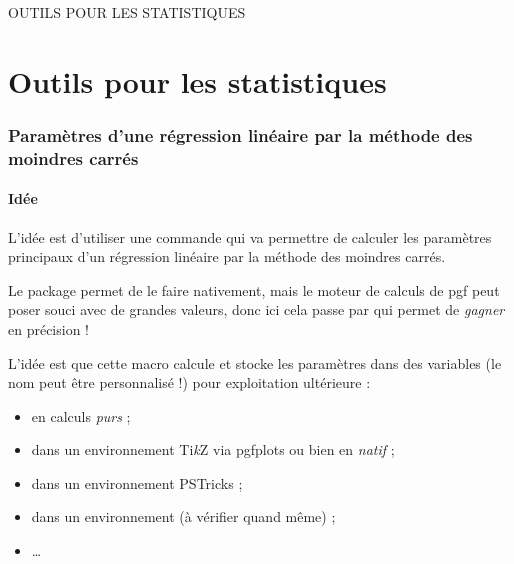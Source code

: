 \documentclass[a4paper,french,11pt]{article}
\providecommand\tikzlogo{Ti\textit{k}Z}
\providecommand\PSTricks{\textsf{PSTricks}\xspace}
\let\TikZ\tikzlogo
\newcommand\ctex[1]{\tcbox[vignettelatex]{#1}}
\begin{document}
\begin{PresCodePL}{}
\end{PresCodePL}

\newpage

\phantom{t}\par\vfill\par
\begin{PART}
	\begin{center}
		\Huge\MakeUppercase{Outils pour les statistiques}
	\end{center}
\end{PART}
\par\vfill\par\phantom{t}

\newpage

\part{Outils pour les statistiques}

\section{Paramètres d'une régression linéaire par la méthode des moindres carrés}\label{reglin}

\subsection{Idée}

\begin{tipblock}
L'idée est d'utiliser une commande qui va permettre de calculer les paramètres principaux d'un régression linéaire par la méthode des moindres carrés.

Le package \ctex{pgfpots} permet de le faire nativement, mais le moteur de calculs de \textsf{pgf} peut poser souci avec de grandes valeurs, donc ici cela passe par \ctex{xfp} qui permet de \textit{gagner} en précision !

\smallskip

L'idée est que cette macro calcule et stocke les paramètres dans des variables (le nom peut être personnalisé !) pour exploitation ultérieure :

\begin{itemize}
	\item en calculs \textit{purs} ;
	\item dans un environnement \TikZ{} via \textsf{pgfplots} ou bien en \textit{natif} ;
	\item dans un environnement \PSTricks{} ;
	\item dans un environnement  (à vérifier quand même) ;
	\item \ldots
\end{itemize}
\vspace*{-\baselineskip}\leavevmode
\end{tipblock}
\end{document}
